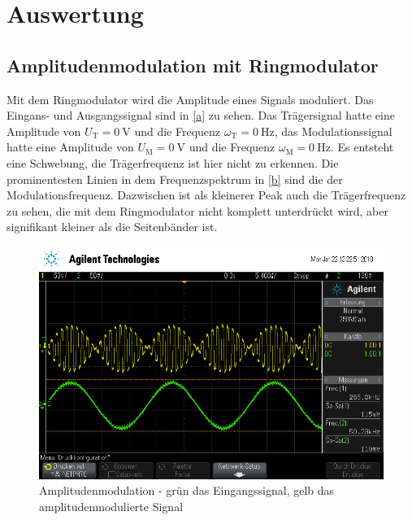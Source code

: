 \section{Auswertung}

\subsection{Amplitudenmodulation mit Ringmodulator}

Mit dem Ringmodulator wird die Amplitude eines Signals moduliert. Das Eingans- und Ausgangssignal sind in \autoref{a} zu sehen. Das Trägersignal hatte eine Amplitude von $U_\text{T}=\SI{0}{\volt}$ und die Frequenz $\omega_\text{T}=\SI{0}{\hertz}$, das Modulationssignal hatte eine Amplitude von $U_\text{M}=\SI{0}{\volt}$ und die Frequenz $\omega_\text{M}=\SI{0}{\hertz}$. Es entsteht eine Schwebung, die Trägerfrequenz ist hier nicht zu erkennen. Die prominentesten Linien in dem Frequenzspektrum in \autoref{b} sind die der Modulationsfrequenz. Dazwischen ist als kleinerer Peak auch die Trägerfrequenz zu sehen, die mit dem Ringmodulator nicht komplett unterdrückt wird, aber signifikant kleiner als die Seitenbänder ist.

\begin{figure}
	\centering
	\includegraphics[width=\textwidth]{img/a_scope_230.png}
	\caption{Amplitudenmodulation - grün das Eingangssignal, gelb das amplitudenmodulierte Signal}
	\label{a}
\end{figure}

